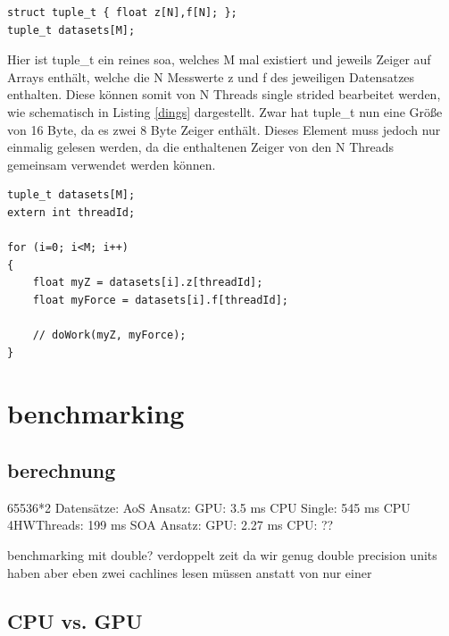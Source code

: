 \begin{lstlisting}
struct tuple_t { float z[N],f[N]; };
tuple_t datasets[M];
\end{lstlisting}

Hier ist tuple\_t ein reines \gls{soa}, welches M mal existiert und jeweils Zeiger auf Arrays enthält, welche die N Messwerte z und f des jeweiligen Datensatzes enthalten. Diese können somit von N Threads single strided bearbeitet werden, wie schematisch in Listing \ref{dings} dargestellt.
Zwar hat tuple\_t nun eine Größe von 16 Byte, da es zwei 8 Byte Zeiger enthält. Dieses Element muss jedoch nur einmalig gelesen werden, da die enthaltenen Zeiger von den N Threads gemeinsam verwendet werden können.

\begin{lstlisting}
tuple_t datasets[M];
extern int threadId;

for (i=0; i<M; i++)
{
    float myZ = datasets[i].z[threadId];
    float myForce = datasets[i].f[threadId];
    
    // doWork(myZ, myForce);
}
\end{lstlisting}


\chapter{benchmarking}
%
%


\section{berechnung}
65536*2 Datensätze:
AoS Ansatz: GPU: 3.5 ms CPU Single: 545 ms CPU 4HWThreads: 199 ms
SOA Ansatz: GPU: 2.27 ms CPU: ??

benchmarking mit double? verdoppelt zeit da wir genug double precision units haben aber eben zwei cachlines lesen müssen anstatt von nur einer

\section{CPU vs. GPU}


